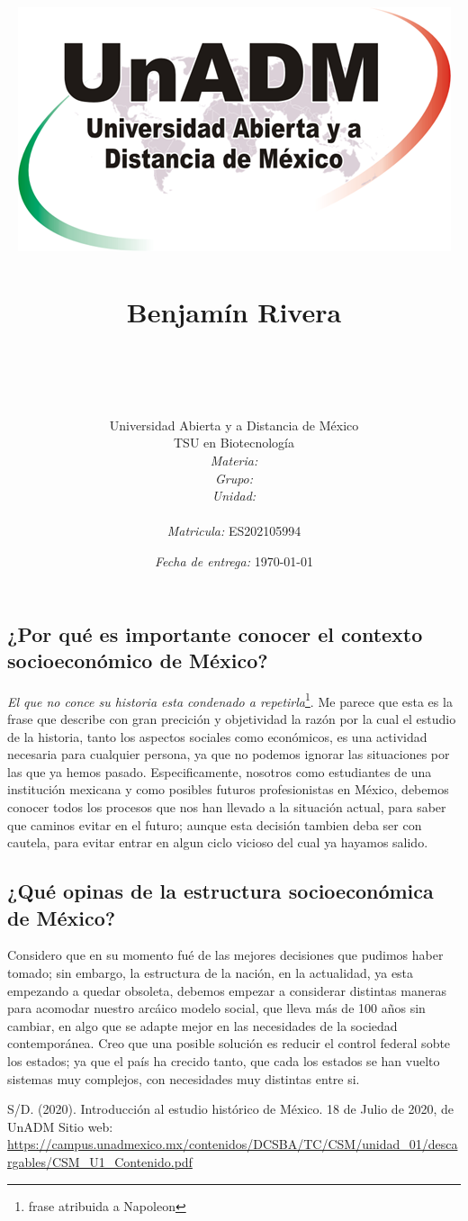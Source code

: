 \documentclass[12pt]{article}
\title{
	\includegraphics{../../../assets/logo-unadm} \\
	\ \\ Benjam\'in Rivera \\
	\bf{\titulo}\\\ \\}
\author{
	Universidad Abierta y a Distancia de México \\
	TSU en Biotecnolog\'ia \\
	\textit{Materia:} \materia \\
	\textit{Grupo:} \grupo \\
	\textit{Unidad:} \unidad \\
	\\
	\textit{Matricula:} ES202105994 }
\date{\textit{Fecha de entrega:} \today}
\begin{document}
\maketitle\newpage

\subsection*{¿Por qué es importante conocer el contexto socioeconómico de México?}

\textit{El que no conce su historia esta condenado a repetirla}\footnote{frase atribuida a Napoleon}. Me parece que esta es la frase que describe con gran precición y objetividad la razón por la cual el estudio de la historia, tanto los aspectos sociales como económicos, es una actividad necesaria para cualquier persona, ya que no podemos ignorar las situaciones por las que ya hemos pasado. Especificamente, nosotros como estudiantes de una institución mexicana y como posibles futuros profesionistas en México, debemos conocer todos los procesos que nos han llevado a la situación actual, para saber que caminos evitar en el futuro; aunque esta decisión tambien deba ser con cautela, para evitar entrar en algun ciclo vicioso del cual ya hayamos salido.


\subsection*{¿Qué opinas de la estructura socioeconómica de México?}

Considero que en su momento fué de las mejores decisiones que pudimos haber tomado; sin embargo, la estructura de la nación, en la actualidad, ya esta empezando a quedar obsoleta, debemos empezar a considerar distintas maneras para acomodar nuestro arcáico modelo social, que lleva más de 100 años sin cambiar, en algo que se adapte mejor en las necesidades de la sociedad contemporánea. Creo que una posible solución es reducir el control federal sobte los estados; ya que el país ha crecido tanto, que cada los estados se han vuelto sistemas muy complejos, con necesidades muy distintas entre si.





\begin{thebibliography}{X}
	 S/D. (2020). Introducción al estudio histórico de México. 18 de Julio de 2020, de UnADM Sitio web: \url{https://campus.unadmexico.mx/contenidos/DCSBA/TC/CSM/unidad_01/descargables/CSM_U1_Contenido.pdf}
\end{thebibliography}
\end{document}
